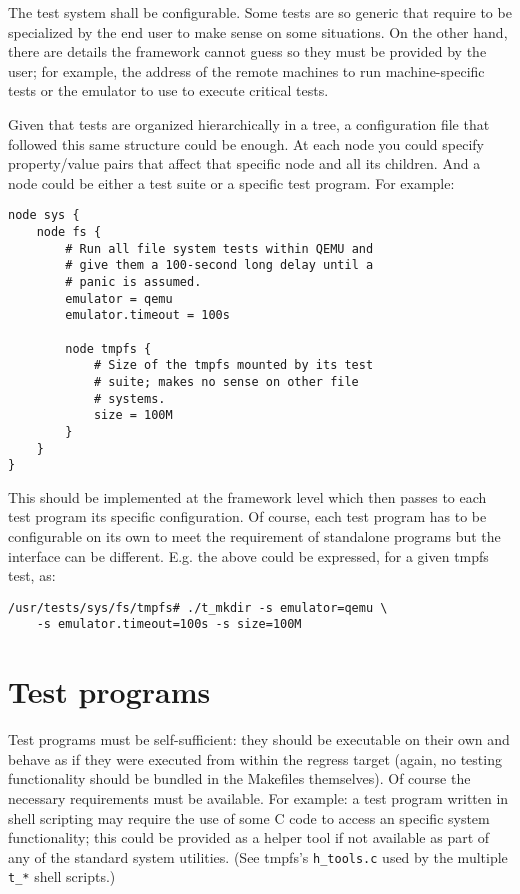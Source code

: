 \documentclass[a4paper,10pt]{article}
\begin{document}
The test system shall be configurable.  Some tests are so generic that
require to be specialized by the end user to make sense on some
situations.  On the other hand, there are details the framework cannot
guess so they must be provided by the user; for example, the address of
the remote machines to run machine-specific tests or the emulator to use
to execute critical tests.

Given that tests are organized hierarchically in a tree, a configuration
file that followed this same structure could be enough.  At each node you
could specify property/value pairs that affect that specific node and all
its children.  And a node could be either a test suite or a specific test
program.  For example:

\begin{verbatim}
node sys {
    node fs {
        # Run all file system tests within QEMU and
        # give them a 100-second long delay until a
        # panic is assumed.
        emulator = qemu
        emulator.timeout = 100s

        node tmpfs {
            # Size of the tmpfs mounted by its test
            # suite; makes no sense on other file
            # systems.
            size = 100M
        }
    }
}
\end{verbatim}

This should be implemented at the framework level which then passes to
each test program its specific configuration.  Of course, each test program
has to be configurable on its own to meet the requirement of standalone
programs but the interface can be different.  E.g. the above could be
expressed, for a given tmpfs test, as:

\begin{verbatim}
/usr/tests/sys/fs/tmpfs# ./t_mkdir -s emulator=qemu \
    -s emulator.timeout=100s -s size=100M
\end{verbatim}



\section{Test programs}

Test programs must be self-sufficient: they should be executable on their
own and behave as if they were executed from within the regress target
(again, no testing functionality should be bundled in the Makefiles
themselves).  Of course the necessary requirements must be available.  For
example: a test program written in shell scripting may require the use of
some C code to access an specific system functionality; this could be
provided as a helper tool if not available as part of any of the standard
system utilities.  (See tmpfs's \verb*|h_tools.c| used by the multiple
\verb*|t_*| shell scripts.)
\end{document}
